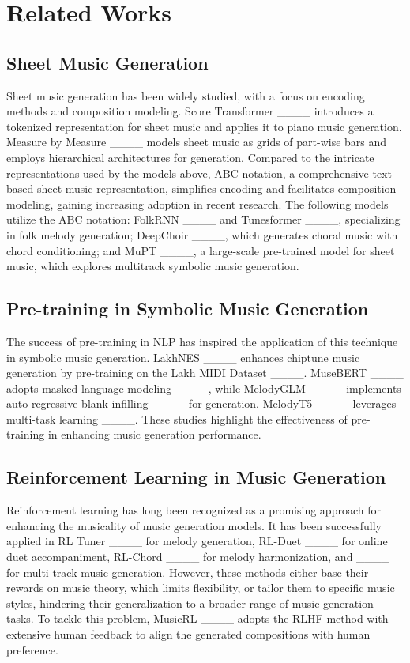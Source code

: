 \section{Related Works}
\subsection{Sheet Music Generation}

Sheet music generation has been widely studied, with a focus on encoding methods and composition modeling. Score Transformer ____ introduces a tokenized representation for sheet music and applies it to piano music generation. Measure by Measure ____ models sheet music as grids of part-wise bars and employs hierarchical architectures for generation. Compared to the intricate representations used by the models above, ABC notation, a comprehensive text-based sheet music representation, simplifies encoding and facilitates composition modeling, gaining increasing adoption in recent research. The following models utilize the ABC notation: FolkRNN ____ and Tunesformer ____, specializing in folk melody generation; DeepChoir ____, which generates choral music with chord conditioning; and MuPT ____, a large-scale pre-trained model for sheet music, which explores multitrack symbolic music generation. 

\subsection{Pre-training in Symbolic Music Generation}

The success of pre-training in NLP has inspired the application of this technique in symbolic music generation. LakhNES ____ enhances chiptune music generation by pre-training on the Lakh MIDI Dataset ____. MuseBERT ____ adopts masked language modeling ____, while MelodyGLM ____ implements auto-regressive blank infilling ____ for generation. 
MelodyT5 ____ leverages multi-task learning ____. These studies highlight the effectiveness of pre-training in enhancing music generation performance.

\subsection{Reinforcement Learning in Music Generation}

Reinforcement learning has long been recognized as a promising approach for enhancing the musicality of music generation models. It has been successfully applied in RL Tuner ____ for melody generation, RL-Duet ____ for online duet accompaniment, RL-Chord ____ for melody harmonization, and ____ for multi-track music generation. However, these methods either base their rewards on music theory, which limits flexibility, or tailor them to specific music styles, hindering their generalization to a broader range of music generation tasks. To tackle this problem, MusicRL ____ adopts the RLHF method with extensive human feedback to align the generated compositions with human preference.

